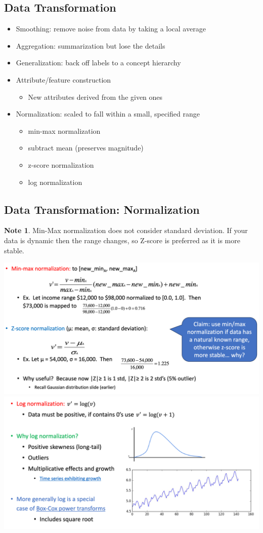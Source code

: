\documentclass[11pt]{article}
\theoremstyle{definition}
\newtheorem{note}{Note}
\begin{document}
\subsection{Data Transformation}
\begin{itemize}
    \item Smoothing: remove noise from data by taking a local average
    \item Aggregation: summarization but lose the details
    \item Generalization: back off labels to a concept hierarchy
    \item Attribute/feature construction
    \begin{itemize}
        \item New attributes derived from the given ones
    \end{itemize}
    \item Normalization: scaled to fall within a small, specified range
    \begin{itemize}
        \item min-max normalization
        \item subtract mean (preserves magnitude)
        \item z-score normalization
        \item log normalization
    \end{itemize}
\end{itemize}
\subsection{Data Transformation: Normalization}
\begin{note}
    Min-Max normalization does not consider standard deviation. If your data is dynamic then the range changes, so Z-score is preferred as it is more stable.
\end{note}
\includegraphics[width=\textwidth/2]{18.png}
\includegraphics[width=\textwidth/2]{19.png}
\end{document}
